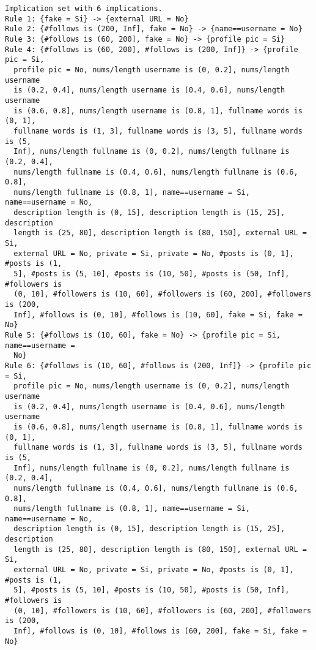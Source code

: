 \documentclass[
  letterpaper,
  DIV=11,
  numbers=noendperiod]{scrreprt}
\begin{document}
\begin{verbatim}
Implication set with 6 implications.
Rule 1: {fake = Si} -> {external URL = No}
Rule 2: {#follows is (200, Inf], fake = No} -> {name==username = No}
Rule 3: {#follows is (60, 200], fake = No} -> {profile pic = Si}
Rule 4: {#follows is (60, 200], #follows is (200, Inf]} -> {profile pic = Si,
  profile pic = No, nums/length username is (0, 0.2], nums/length username
  is (0.2, 0.4], nums/length username is (0.4, 0.6], nums/length username
  is (0.6, 0.8], nums/length username is (0.8, 1], fullname words is (0, 1],
  fullname words is (1, 3], fullname words is (3, 5], fullname words is (5,
  Inf], nums/length fullname is (0, 0.2], nums/length fullname is (0.2, 0.4],
  nums/length fullname is (0.4, 0.6], nums/length fullname is (0.6, 0.8],
  nums/length fullname is (0.8, 1], name==username = Si, name==username = No,
  description length is (0, 15], description length is (15, 25], description
  length is (25, 80], description length is (80, 150], external URL = Si,
  external URL = No, private = Si, private = No, #posts is (0, 1], #posts is (1,
  5], #posts is (5, 10], #posts is (10, 50], #posts is (50, Inf], #followers is
  (0, 10], #followers is (10, 60], #followers is (60, 200], #followers is (200,
  Inf], #follows is (0, 10], #follows is (10, 60], fake = Si, fake = No}
Rule 5: {#follows is (10, 60], fake = No} -> {profile pic = Si, name==username =
  No}
Rule 6: {#follows is (10, 60], #follows is (200, Inf]} -> {profile pic = Si,
  profile pic = No, nums/length username is (0, 0.2], nums/length username
  is (0.2, 0.4], nums/length username is (0.4, 0.6], nums/length username
  is (0.6, 0.8], nums/length username is (0.8, 1], fullname words is (0, 1],
  fullname words is (1, 3], fullname words is (3, 5], fullname words is (5,
  Inf], nums/length fullname is (0, 0.2], nums/length fullname is (0.2, 0.4],
  nums/length fullname is (0.4, 0.6], nums/length fullname is (0.6, 0.8],
  nums/length fullname is (0.8, 1], name==username = Si, name==username = No,
  description length is (0, 15], description length is (15, 25], description
  length is (25, 80], description length is (80, 150], external URL = Si,
  external URL = No, private = Si, private = No, #posts is (0, 1], #posts is (1,
  5], #posts is (5, 10], #posts is (10, 50], #posts is (50, Inf], #followers is
  (0, 10], #followers is (10, 60], #followers is (60, 200], #followers is (200,
  Inf], #follows is (0, 10], #follows is (60, 200], fake = Si, fake = No}
\end{verbatim}
\end{document}
